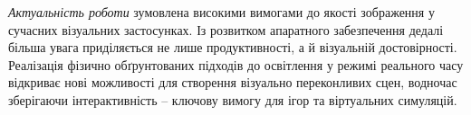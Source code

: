 \par \textit{Актуальність роботи} зумовлена високими вимогами до якості зоб\-ра\-жен\-ня у сучасних візуальних застосунках. Із розвитком апаратного забезпечення дедалі більша увага приділяється не лише продуктивності, а й візуальній достовірності. Реалізація фізично обґрунтованих підходів до освітлення у режимі реального часу відкриває нові можливості для створення візуально переконливих сцен, водночас зберігаючи інтерактивність -- ключову вимогу для ігор та віртуальних симуляцій.